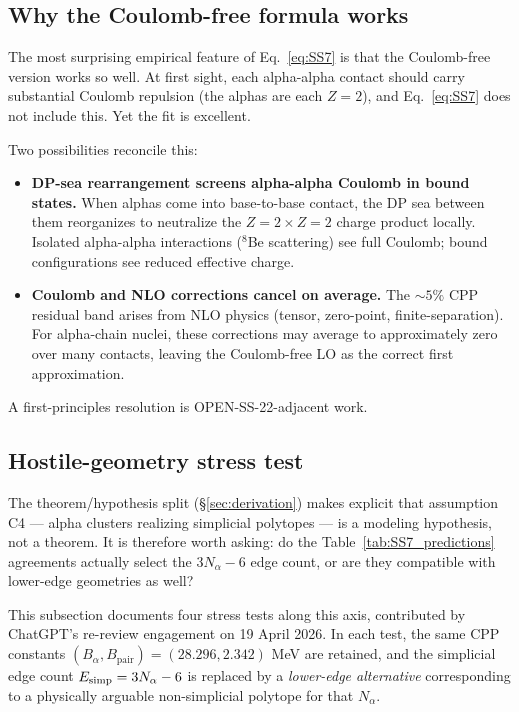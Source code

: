 \documentclass[11pt,letterpaper]{article}
\newcommand{\Bpair}{B_{\mathrm{pair}}}
\newcommand{\Balpha}{B_{\alpha}}
\newcommand{\Nalpha}{N_{\alpha}}
\begin{document}
\subsection{Why the Coulomb-free formula works}

The most surprising empirical feature of Eq.~\ref{eq:SS7} is that the Coulomb-free version works so well. At first sight, each alpha-alpha contact should carry substantial Coulomb repulsion (the alphas are each $Z = 2$), and Eq.~\ref{eq:SS7} does not include this. Yet the fit is excellent.

Two possibilities reconcile this:
\begin{itemize}
\item \textbf{DP-sea rearrangement screens alpha-alpha Coulomb in bound states.} When alphas come into base-to-base contact, the DP sea between them reorganizes to neutralize the $Z = 2 \times Z = 2$ charge product locally. Isolated alpha-alpha interactions (${}^8$Be scattering) see full Coulomb; bound configurations see reduced effective charge.
\item \textbf{Coulomb and NLO corrections cancel on average.} The $\sim 5\%$ CPP residual band arises from NLO physics (tensor, zero-point, finite-separation). For alpha-chain nuclei, these corrections may average to approximately zero over many contacts, leaving the Coulomb-free LO as the correct first approximation.
\end{itemize}
A first-principles resolution is OPEN-SS-22-adjacent work.

\subsection{Hostile-geometry stress test}
\label{sec:stress_test}

The theorem/hypothesis split (\S\ref{sec:derivation}) makes explicit that assumption C4 --- alpha clusters realizing simplicial polytopes --- is a modeling hypothesis, not a theorem. It is therefore worth asking: do the Table~\ref{tab:SS7_predictions} agreements actually select the $3\Nalpha - 6$ edge count, or are they compatible with lower-edge geometries as well?

This subsection documents four stress tests along this axis, contributed by ChatGPT's re-review engagement on 19 April 2026. In each test, the same CPP constants $(\Balpha, \Bpair) = (28.296, 2.342)$ MeV are retained, and the simplicial edge count $E_{\rm simp} = 3\Nalpha - 6$ is replaced by a \emph{lower-edge alternative} corresponding to a physically arguable non-simplicial polytope for that $\Nalpha$.
\end{document}
